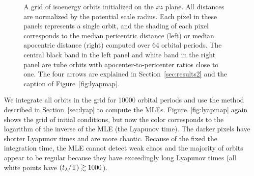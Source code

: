 \documentclass{mn2e}
\newcommand{\periods}{\ensuremath{{\rm T}}}
\begin{document}
\begin{figure}[h]%
\centering
\caption{ A grid of isoenergy orbits initialized on the $xz$ plane. All distances are normalized by the potential scale radius. Each pixel in these panels represents a single orbit, and the shading of each pixel corresponds to the median pericentric distance (left) or median apocentric distance (right) computed over 64 orbital periods. The central black band in the left panel and white band in the right panel are tube orbits with apocenter-to-pericenter ratios close to one. The four arrows are explained in Section~\ref{sec:results2} and the caption of Figure~\ref{fig:lyapmap}.}
\label{fig:apoper}
\end{figure}

We integrate all orbits in the grid for 10000 orbital periods and use the method described in Section~\ref{sec:lyap} to compute the MLEs. Figure~\ref{fig:lyapmap} again shows the grid of initial conditions, but now the color corresponds to the logarithm of the inverse of the MLE (the Lyapunov time). The darker pixels have shorter Lyapunov times and are more chaotic. Because of the fixed the integration time, the MLE cannot detect weak chaos and the majority of orbits appear to be regular because they have exceedingly long Lyapunov times (all white points have $(t_\lambda/\periods) \gtrsim 1000$).
\end{document}
